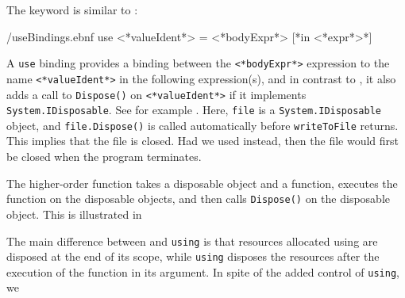 \documentclass[fsharpNotes.tex]{subfiles}
\begin{document}
The  keyword is similar to :
%
\begin{verbatimwrite}{\ebnf/useBindings.ebnf}
use <*valueIdent*> = <*bodyExpr*> [*in <*expr*>*]
\end{verbatimwrite}
%
A \lstinline{use} binding provides a binding between the \lstinline[language=syntax]{<*bodyExpr*>} expression to the name \lstinline[language=syntax]{<*valueIdent*>} in the following expression(s), and in contrast to , it also adds a call to \lstinline{Dispose()} on \lstinline[language=syntax]{<*valueIdent*>}  if it implements \lstinline{System.IDisposable}. See for example .
%
%
Here, \lstinline{file} is a \lstinline{System.IDisposable} object, and \lstinline{file.Dispose()} is called automatically before \lstinline{writeToFile} returns. This implies that the file is closed. Had we used  instead, then the file would first be closed when the program terminates.

The higher-order function  takes a disposable object and a function, executes the function on the disposable objects, and then calls \lstinline{Dispose()} on the disposable object. This is illustrated in 

%
%
The main difference between  and \lstinline{using} is that resources allocated using  are disposed at the end of its scope, while \lstinline{using} disposes the resources after the execution of the function in its argument. In spite of the added control of \lstinline{using}, we 
\end{document}
